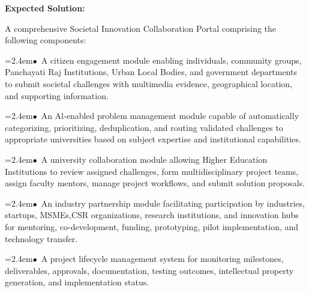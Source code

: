 \documentclass[10pt,a4paper]{article}
\begin{document}
\begin{tcolorbox}[pscard, title={"\textbf{SIH26043} \quad $\vert$ \quad A digital platform to crowdsource societal challenges and facilitate collab...}]
\vspace{0.18cm}\noindent\textbf{\color{sihnavy}Expected Solution:}\par\vspace{0.06cm}
\noindent\small A comprehensive Societal Innovation Collaboration Portal comprising the following components:\par\vspace{0.06cm}
\noindent\hspace*{1.2em}\hangindent=2.4em\textcolor{sihblue}{$\bullet$}~\small A citizen engagement module enabling individuals, community groups, Panchayati Raj Institutions, Urban Local Bodies, and government departments to submit societal challenges with multimedia evidence, geographical location, and supporting information.\par\vspace{0.05cm}
\noindent\hspace*{1.2em}\hangindent=2.4em\textcolor{sihblue}{$\bullet$}~\small An Al-enabled problem management module capable of automatically categorizing, prioritizing, deduplication, and routing validated challenges to appropriate universities based on subject expertise and institutional capabilities.\par\vspace{0.05cm}
\noindent\hspace*{1.2em}\hangindent=2.4em\textcolor{sihblue}{$\bullet$}~\small A university collaboration module allowing Higher Education Institutions to review assigned challenges, form multidisciplinary project teams, assign faculty mentors, manage project workflows, and submit solution proposals.\par\vspace{0.05cm}
\noindent\hspace*{1.2em}\hangindent=2.4em\textcolor{sihblue}{$\bullet$}~\small An industry partnership module facilitating participation by industries, startups, MSMEs,CSR organizations, research institutions, and innovation hubs for mentoring, co-development, funding, prototyping, pilot implementation, and technology transfer.\par\vspace{0.05cm}
\noindent\hspace*{1.2em}\hangindent=2.4em\textcolor{sihblue}{$\bullet$}~\small A project lifecycle management system for monitoring milestones, deliverables, approvals, documentation, testing outcomes, intellectual property generation, and implementation status.\par\vspace{0.05cm}

\end{tcolorbox}
\end{document}
